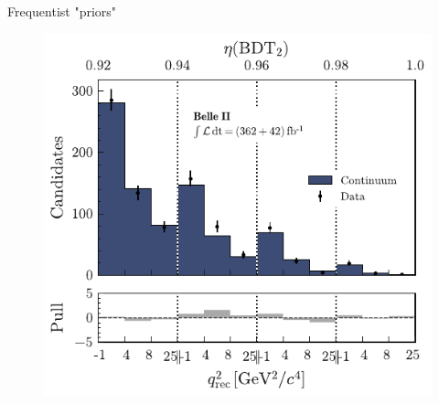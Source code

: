 \documentclass[
aspectratio=169,
14pt,
professionalfonts
]{beamer}
\begin{document}
\begin{frame}{Frequentist "priors"}
\begin{minipage}{0.29\textwidth}
\begin{figure}
            \includegraphics[width=\textwidth]{../plots/knunu-offres.pdf}
        \end{figure}
    \end{minipage}
    \end{frame}
    
\end{document}
